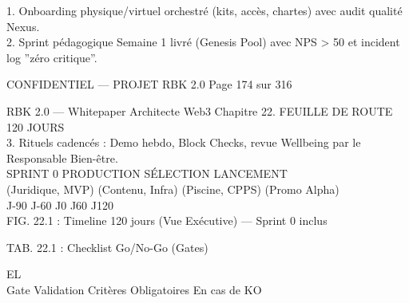 1. Onboarding physique/virtuel orchestré (kits, accès, chartes) avec audit qualité Nexus.\\
\vspace{0.5em}
2. Sprint pédagogique Semaine 1 livré (Genesis Pool) avec NPS \textgreater{} 50 et incident log ”zéro critique”.\\
\vspace{0.5em}
\vspace{0.5em}
\begin{confidential}CONFIDENTIEL — PROJET RBK 2.0                                Page 174 sur 316\end{confidential}
RBK 2.0 — Whitepaper Architecte Web3                                                                                   Chapitre 22. FEUILLE DE ROUTE 120 JOURS\\
\vspace{0.5em}
\vspace{0.5em}
3. Rituels cadencés : Demo hebdo, Block Checks, revue Wellbeing par le Responsable Bien-être.\\
\vspace{0.5em}
\vspace{0.5em}
SPRINT 0               PRODUCTION                SÉLECTION              LANCEMENT\\
(Juridique, MVP)          (Contenu, Infra)         (Piscine, CPPS)         (Promo Alpha)\\
\vspace{0.5em}
\vspace{0.5em}
J-90                      J-60                      J0                      J60                   J120\\
\vspace{0.5em}
FIG. 22.1 : Timeline 120 jours (Vue Exécutive) — Sprint 0 inclus\\
\vspace{0.5em}
\vspace{0.5em}
\begin{center}\begin{tabular}TAB. 22.1 : Checklist Go/No-Go (Gates)\end{tabular}\end{center}
\vspace{0.5em}
\vspace{0.5em}
\vspace{0.5em}
\vspace{0.5em}
EL\\
Gate          Validation      Critères Obligatoires                                  En cas de KO\\
